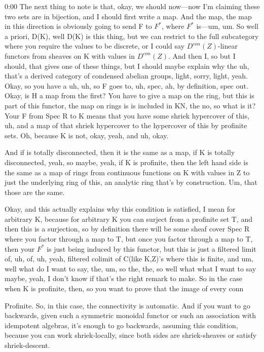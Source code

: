 \begin{unfinished}{0:00}
The next thing to note is that, okay, we should now---now I'm claiming these two sets are in bijection, and I should first write a map. And the map, the map in this direction is obviously going to send F to $F^*$, where $F^*$ is---um, um. So well a priori, D(K), well D(K) is this thing, but we can restrict to the full subcategory where you require the values to be discrete, or I could say $D^{con}(Z)$-linear functors from sheaves on K with values in $D^{con}(Z)$. And then I, so but I should, that gives one of these things, but I should maybe explain why the uh, that's a derived category of condensed abelian groups, light, sorry, light, yeah. Okay, so you have a uh, uh, so F goes to, uh, spec, ah, by definition, spec out. Okay, is H a map from the first? You have to give a map on the ring, but this is part of this functor, the map on rings is is included in KN, the no, so what is it? Your F from Spec R to K means that you have some shriek hypercover of this, uh, and a map of that shriek hypercover to the hypercover of this by profinite sets. Oh, because K is not, okay, yeah, and uh, okay. 

And if is totally disconnected, then it is the same as a map, if K is totally disconnected, yeah, so maybe, yeah, if K is profinite, then the left hand side is the same as a map of rings from continuous functions on K with values in Z to just the underlying ring of this, an analytic ring that's by construction. Um, that those are the same. 

Okay, and this actually explains why this condition is satisfied, I mean for arbitrary K, because for arbitrary K you can surject from a profinite set T, and then this is a surjection, so by definition there will be some sheaf cover Spec R where you factor through a map to T, but once you factor through a map to T, then your $F^*$ is just being induced by this functor, but this is just a filtered limit of, uh, of, uh, yeah, filtered colimit of C(like K,Z)'s where this is finite, and um, well what do I want to say, the, um, so the, the, so well what what I want to say maybe, yeah, I don't know if that's the right remark to make. So in the case when K is profinite, then, so you want to prove that the image of every conn



Profinite. So, in this case, the connectivity is automatic. And if you want to go backwards, given such a symmetric monoidal functor or such an association with idempotent algebras, it's enough to go backwards, assuming this condition, because you can work shriek-locally, since both sides are shriek-sheaves or satisfy shriek-descent. 


\end{unfinished}
